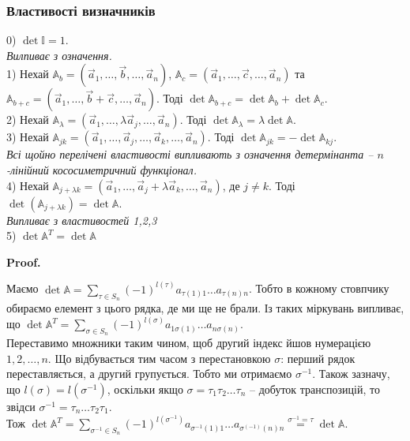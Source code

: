 \documentclass[a4paper, 10pt]{article}
\makeatletter
\theoremstyle{theoremdd}
\renewenvironment{proof}[1][Proof.\\]{\par
\pushQED{\hfill \qed}%
\normalfont \topsep6\p@\@plus6\p@\relax
\trivlist
\item\relax
{\bfseries
#1\@addpunct{.}}\hspace\labelsep\ignorespaces
}{%
\popQED\endtrivlist\@endpefalse
}
\makeatother
\begin{document}
\subsubsection*{Властивості визначників}
0) $\det \mathbb{I} = 1$.\\
\textit{Вилпиває з означення.}
\bigskip \\
1) Нехай $\mathbb{A}_b = (\vec{a}_1, \dots, \vec{b}, \dots, \vec{a}_n)$, $\mathbb{A}_c = (\vec{a}_1, \dots, \vec{c}, \dots, \vec{a}_n)$ та $\mathbb{A}_{b+c} = (\vec{a}_1, \dots, \vec{b}+\vec{c}, \dots, \vec{a}_n)$. Тоді $\det \mathbb{A}_{b+c} = \det \mathbb{A}_b + \det \mathbb{A}_{c}$.
\bigskip \\
2) Нехай $\mathbb{A}_{\lambda} = (\vec{a}_1, \dots, \lambda \vec{a}_j, \dots, \vec{a}_n)$. Тоді $\det \mathbb{A}_{\lambda} = \lambda \det \mathbb{A}$.
\bigskip \\
3) Нехай $\mathbb{A}_{jk} = (\vec{a}_1, \dots, \vec{a}_j, \dots, \vec{a}_k, \dots, \vec{a}_n)$. Тоді $\det \mathbb{A}_{jk} = - \det \mathbb{A}_{kj}$.\\
\textit{Всі щойно перелічені властивості випливають з означення детермінанта -- $n$-лінійний кососиметричний функціонал.}
\bigskip \\
4) Нехай $\mathbb{A}_{j + \lambda k} = (\vec{a}_1,\dots, \vec{a}_j + \lambda \vec{a}_k, \dots, \vec{a}_n)$, де $j \neq k$. Тоді $\det (\mathbb{A}_{j + \lambda k}) = \det \mathbb{A}$.\\
\textit{Випливає з властивостей 1,2,3}
\bigskip \\
5) $\det \mathbb{A}^T = \det \mathbb{A}$
\begin{proof}
Маємо $\det \mathbb{A} = \displaystyle\sum_{\tau \in S_n} (-1)^{l(\tau)}a_{\tau(1)1}\dots a_{\tau(n)n}$. Тобто в кожному стовпчику обираємо елемент з цього рядка, де ми ще не брали. Із таких міркувань випливає, що $\det \mathbb{A}^T = \displaystyle\sum_{\sigma \in S_n} (-1)^{l(\sigma)}a_{1 \sigma(1)}\dots a_{n \sigma(n)}$.\\
Переставимо множники таким чином, щоб другий індекс йшов нумерацією $1,2,\dots,n$. Що відбувається тим часом з перестановкою $\sigma$: перший рядок переставляється, а другий групується. Тобто ми отримаємо $\sigma^{-1}$. Також зазначу, що $l(\sigma) = l(\sigma^{-1})$, оскільки якщо $\sigma = \tau_1 \tau_2 \dots \tau_n$ -- добуток транспозицій, то звідси $\sigma^{-1} = \tau_n \dots \tau_2 \tau_1$.\\
Тож $\det \mathbb{A}^T = \displaystyle\sum_{\sigma^{-1} \in S_n} (-1)^{l(\sigma^{-1})} a_{\sigma^{-1}(1)1}\dots a_{\sigma^{(-1)}(n)n} \overset{\sigma^{-1} = \tau}{=} \det \mathbb{A}$.
\end{proof}
\end{document}
